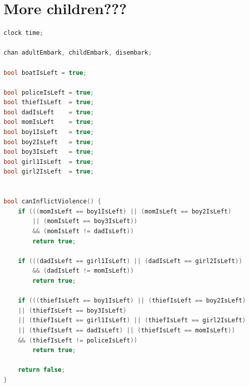 \documentclass[a4paper,12pt]{scrartcl}
\begin{document}
\section*{More children???}

\begin{lstlisting}[language=CPP, label = lst:plugin_example, caption = Global declarations with an extra boy.]
clock time;

chan adultEmbark, childEmbark, disembark;

bool boatIsLeft = true;

bool policeIsLeft = true;
bool thiefIsLeft  = true;
bool dadIsLeft    = true;
bool momIsLeft    = true;
bool boy1IsLeft   = true;
bool boy2IsLeft   = true;
bool boy3IsLeft   = true;
bool girl1IsLeft  = true;
bool girl2IsLeft  = true;


bool canInflictViolence() {
    if (((momIsLeft == boy1IsLeft) || (momIsLeft == boy2IsLeft)
    	|| (momIsLeft == boy3IsLeft))
    	&& (momIsLeft != dadIsLeft))
        return true;

    if (((dadIsLeft == girl1IsLeft) || (dadIsLeft == girl2IsLeft))
    	&& (dadIsLeft != momIsLeft))
        return true;

    if (((thiefIsLeft == boy1IsLeft) || (thiefIsLeft == boy2IsLeft)
    || (thiefIsLeft == boy3IsLeft)
    || (thiefIsLeft == girl1IsLeft) || (thiefIsLeft == girl2IsLeft)
    || (thiefIsLeft == dadIsLeft) || (thiefIsLeft == momIsLeft))
    && (thiefIsLeft != policeIsLeft))
        return true;

    return false;
}
\end{lstlisting}
\end{document}
